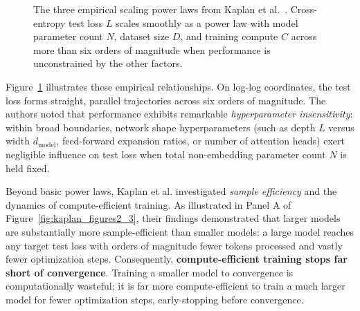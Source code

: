 \documentclass[../../main.tex]{subfiles}
\begin{document}
\begin{figure}[t]
\caption{The three empirical scaling power laws from Kaplan et al.~\cite{kaplan2020}. Cross-entropy test loss $L$ scales smoothly as a power law with model parameter count $N$, dataset size $D$, and training compute $C$ across more than six orders of magnitude when performance is unconstrained by the other factors.}
\label{fig:kaplan_figure1}
\end{figure}

Figure~\ref{fig:kaplan_figure1} illustrates these empirical relationships. On log-log coordinates, the test loss forms straight, parallel trajectories across six orders of magnitude. The authors noted that performance exhibits remarkable \emph{hyperparameter insensitivity}: within broad boundaries, network shape hyperparameters (such as depth $L$ versus width $d_{\text{model}}$, feed-forward expansion ratios, or number of attention heads) exert negligible influence on test loss when total non-embedding parameter count $N$ is held fixed.

Beyond basic power laws, Kaplan et al. investigated \emph{sample efficiency} and the dynamics of compute-efficient training. As illustrated in Panel A of Figure~\ref{fig:kaplan_figures2_3}, their findings demonstrated that larger models are substantially more sample-efficient than smaller models: a large model reaches any target test loss with orders of magnitude fewer tokens processed and vastly fewer optimization steps. Consequently, \textbf{compute-efficient training stops far short of convergence}. Training a smaller model to convergence is computationally wasteful; it is far more compute-efficient to train a much larger model for fewer optimization steps, early-stopping before convergence.
\end{document}
